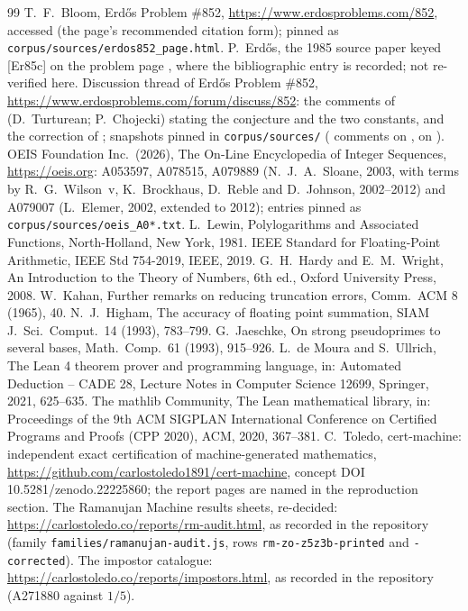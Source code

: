\documentclass[11pt]{article}
\theoremstyle{definition}\newtheorem{observation}{Observation}
\begin{document}
\begin{thebibliography}{99}\small
{} T.~F.~Bloom, Erd\H{o}s Problem \#852, \url{https://www.erdosproblems.com/852}, accessed \PageAccessed{} (the page's recommended citation form); pinned as \texttt{corpus/sources/erdos852\_page.html}.
 P.~Erd\H{o}s, the 1985 source paper keyed [Er85c] on the problem page \cite{Bloom852}, where the bibliographic entry is recorded; not re-verified here.
 Discussion thread of Erd\H{o}s Problem \#852, \url{https://www.erdosproblems.com/forum/discuss/852}: the comments of \ThreadDateConstants{} (D.~Turturean; P.~Chojecki) stating the conjecture and the two constants, and the correction of \ThreadDateCorrection; snapshots pinned in \texttt{corpus/sources/} (\ThreadCommentsBefore{} comments on \ThreadFetchDate, \ThreadCommentsAfter{} on \ThreadSnapshotDate).
 OEIS Foundation Inc.\ (2026), The On-Line Encyclopedia of Integer Sequences, \url{https://oeis.org}: A053597, A078515, A079889 (N.~J.~A.~Sloane, 2003, with terms by R.~G.~Wilson~v, K.~Brockhaus, D.~Reble and D.~Johnson, 2002--2012) and A079007 (L.~Elemer, 2002, extended to 2012); entries pinned as \texttt{corpus/sources/oeis\_A0*.txt}.
 L.~Lewin, Polylogarithms and Associated Functions, North-Holland, New York, 1981.
 IEEE Standard for Floating-Point Arithmetic, IEEE Std 754-2019, IEEE, 2019.
 G.~H.~Hardy and E.~M.~Wright, An Introduction to the Theory of Numbers, 6th ed., Oxford University Press, 2008.
 W.~Kahan, Further remarks on reducing truncation errors, Comm.\ ACM 8 (1965), 40.
 N.~J.~Higham, The accuracy of floating point summation, SIAM J.\ Sci.\ Comput.\ 14 (1993), 783--799.
 G.~Jaeschke, On strong pseudoprimes to several bases, Math.\ Comp.\ 61 (1993), 915--926.
 L.~de Moura and S.~Ullrich, The Lean 4 theorem prover and programming language, in: Automated Deduction -- CADE 28, Lecture Notes in Computer Science 12699, Springer, 2021, 625--635.
 The mathlib Community, The Lean mathematical library, in: Proceedings of the 9th ACM SIGPLAN International Conference on Certified Programs and Proofs (CPP 2020), ACM, 2020, 367--381.
 C.~Toledo, cert-machine: independent exact certification of machine-generated mathematics, \url{https://github.com/carlostoledo1891/cert-machine}, concept DOI 10.5281/zenodo.22225860; the report pages are named in the reproduction section.
 The Ramanujan Machine results sheets, re-decided: \url{https://carlostoledo.co/reports/rm-audit.html}, as recorded in the repository \cite{Repo} (family \texttt{families/ramanujan-audit.js}, rows \texttt{rm-zo-z5z3b-printed} and \texttt{-corrected}).
 The impostor catalogue: \url{https://carlostoledo.co/reports/impostors.html}, as recorded in the repository \cite{Repo} (A271880 against $1/5$).
\end{thebibliography}
\end{document}
